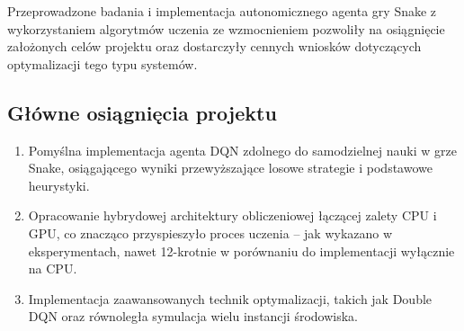 \documentclass[a4paper,12pt]{article}
\begin{document}
Przeprowadzone badania i implementacja autonomicznego agenta gry Snake z wykorzystaniem algorytmów uczenia ze wzmocnieniem pozwoliły na osiągnięcie założonych celów projektu oraz dostarczyły cennych wniosków dotyczących optymalizacji tego typu systemów.

\subsection*{Główne osiągnięcia projektu}
\begin{enumerate}
  \item Pomyślna implementacja agenta DQN zdolnego do samodzielnej nauki w grze Snake, osiągającego wyniki przewyższające losowe strategie i podstawowe heurystyki.
  \item Opracowanie hybrydowej architektury obliczeniowej łączącej zalety CPU i GPU, co znacząco przyspieszyło proces uczenia – jak wykazano w eksperymentach, nawet 12-krotnie w porównaniu do implementacji wyłącznie na CPU.
  \item Implementacja zaawansowanych technik optymalizacji, takich jak Double DQN oraz równoległa symulacja wielu instancji środowiska.
\end{enumerate}
\end{document}
